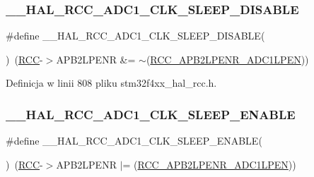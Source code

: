 \subsubsection{\texorpdfstring{\+\_\+\+\_\+\+H\+A\+L\+\_\+\+R\+C\+C\+\_\+\+A\+D\+C1\+\_\+\+C\+L\+K\+\_\+\+S\+L\+E\+E\+P\+\_\+\+D\+I\+S\+A\+B\+LE}{\_\_HAL\_RCC\_ADC1\_CLK\_SLEEP\_DISABLE}}
{\footnotesize\ttfamily \#define \+\_\+\+\_\+\+H\+A\+L\+\_\+\+R\+C\+C\+\_\+\+A\+D\+C1\+\_\+\+C\+L\+K\+\_\+\+S\+L\+E\+E\+P\+\_\+\+D\+I\+S\+A\+B\+LE(\begin{DoxyParamCaption}{ }\end{DoxyParamCaption})~(\hyperlink{group___peripheral__declaration_ga74944438a086975793d26ae48d5882d4}{R\+CC}-\/$>$A\+P\+B2\+L\+P\+E\+NR \&= $\sim$(\hyperlink{group___peripheral___registers___bits___definition_ga126a8791f77cecc599e32d2c882a4dab}{R\+C\+C\+\_\+\+A\+P\+B2\+L\+P\+E\+N\+R\+\_\+\+A\+D\+C1\+L\+P\+EN}))}



Definicja w linii 808 pliku stm32f4xx\+\_\+hal\+\_\+rcc.\+h.

\mbox{\label{group___r_c_c___a_p_b2___low_power___enable___disable_ga37931819af9a7b1a05385e0ae6c984b6}} 
\subsubsection{\texorpdfstring{\+\_\+\+\_\+\+H\+A\+L\+\_\+\+R\+C\+C\+\_\+\+A\+D\+C1\+\_\+\+C\+L\+K\+\_\+\+S\+L\+E\+E\+P\+\_\+\+E\+N\+A\+B\+LE}{\_\_HAL\_RCC\_ADC1\_CLK\_SLEEP\_ENABLE}}
{\footnotesize\ttfamily \#define \+\_\+\+\_\+\+H\+A\+L\+\_\+\+R\+C\+C\+\_\+\+A\+D\+C1\+\_\+\+C\+L\+K\+\_\+\+S\+L\+E\+E\+P\+\_\+\+E\+N\+A\+B\+LE(\begin{DoxyParamCaption}{ }\end{DoxyParamCaption})~(\hyperlink{group___peripheral__declaration_ga74944438a086975793d26ae48d5882d4}{R\+CC}-\/$>$A\+P\+B2\+L\+P\+E\+NR $\vert$= (\hyperlink{group___peripheral___registers___bits___definition_ga126a8791f77cecc599e32d2c882a4dab}{R\+C\+C\+\_\+\+A\+P\+B2\+L\+P\+E\+N\+R\+\_\+\+A\+D\+C1\+L\+P\+EN}))}



